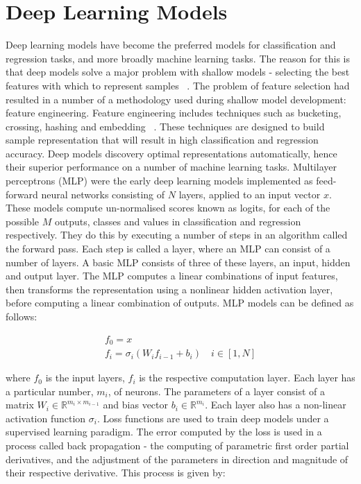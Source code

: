 \section{Deep Learning Models}

Deep learning models have become the preferred models for classification and regression tasks, and more broadly machine learning tasks. The reason for this is that deep models solve a major problem with shallow models - selecting the best features with which to represent samples ~\citep{Goodfellow-et-al-2016}. The problem of feature selection had resulted in a number of a methodology used during shallow model development: feature engineering. Feature engineering includes techniques such as bucketing, crossing, hashing and embedding ~\citep{murphy2012machine, Goodfellow-et-al-2016}. These techniques are designed to build sample representation that will result in high classification and regression accuracy. Deep models discovery optimal representations automatically, hence their superior performance on a number of machine learning tasks. \newline
Multilayer perceptrons (MLP) were the early deep learning models implemented as feed-forward neural networks consisting of $N$ layers, applied to an input vector $ x $. These models compute un-normalised scores known as logits, for each of the possible $ M $ outputs, classes and values in classification and regression respectively. They do this by executing a number of steps in an algorithm called the forward pass. Each step is called a layer, where an MLP can consist of a number of layers. A basic MLP consists of three of these layers, an input, hidden and output layer. The MLP computes a linear combinations of input features, then transforms the representation using a nonlinear hidden activation layer, before computing a linear combination of outputs. MLP models can be defined as follows:

\begin{subequations}
	\begin{gather}
		f_0 = x \\
		f_i=\sigma_i(W_if_{i - 1} + b_i) \quad i \in [1, N]
	\end{gather}
\end{subequations}

where $f_0$ is the input layers, $f_i$ is the respective computation layer. Each layer has a particular number,  $m_i$, of neurons. The parameters of a layer consist of a matrix $W_i \in \mathbb{R}^{m_i \times m_{i-1}}$ and bias vector $b_i \in  \mathbb{R}^{m_i}$. Each layer also has a non-linear activation function $\sigma_i$. \newline
Loss functions are used to train deep models under a supervised learning paradigm. The error computed by the loss is used in a process called back propagation - the computing of parametric first order partial derivatives, and the adjustment of the parameters in direction and magnitude of their respective derivative. This process is given by:

